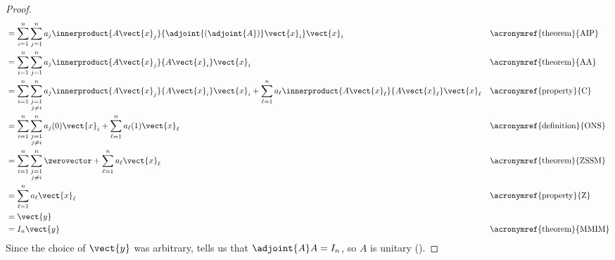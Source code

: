 \begin{proof}
\begin{align*}
%
&=\sum_{i=1}^{n}\sum_{j=1}^{n}a_j\innerproduct{A\vect{x}_j}{\adjoint{\left(\adjoint{A}\right)}\vect{x}_i}\vect{x}_i
&&\text{\acronymref{theorem}{AIP}}\\
%
&=\sum_{i=1}^{n}\sum_{j=1}^{n}a_j\innerproduct{A\vect{x}_j}{A\vect{x}_i}\vect{x}_i
&&\text{\acronymref{theorem}{AA}}\\
%
&=
\sum_{i=1}^{n}\sum_{\substack{j=1\\j\neq i}}^{n}a_j\innerproduct{A\vect{x}_j}{A\vect{x}_i}\vect{x}_i
+
\sum_{\ell=1}^{n}a_\ell\innerproduct{A\vect{x}_\ell}{A\vect{x}_\ell}\vect{x}_\ell
&&\text{\acronymref{property}{C}}\\
%
&=
\sum_{i=1}^{n}\sum_{\substack{j=1\\j\neq i}}^{n}a_j(0)\vect{x}_i
+
\sum_{\ell=1}^{n}a_\ell(1)\vect{x}_\ell
&&\text{\acronymref{definition}{ONS}}\\
%
&=
\sum_{i=1}^{n}\sum_{\substack{j=1\\j\neq i}}^{n}\zerovector
+
\sum_{\ell=1}^{n}a_\ell\vect{x}_\ell
&&\text{\acronymref{theorem}{ZSSM}}\\
%
&=\sum_{\ell=1}^{n}a_\ell\vect{x}_\ell
&&\text{\acronymref{property}{Z}}\\
%
&=\vect{y}\\
%
&=I_n\vect{y}
&&\text{\acronymref{theorem}{MMIM}}
%
\end{align*}
%
Since the choice of $\vect{y}$ was arbitrary,  tells us that $\adjoint{A}A=I_n$, so $A$ is unitary ().
%
\end{proof}
%
